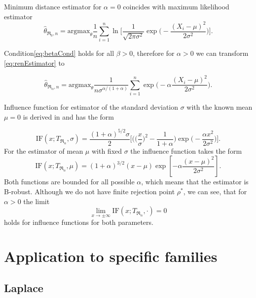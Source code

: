 Minimum \ren distance estimator for $\alpha = 0$ coincides with maximum likelihood estimator
\begin{equation}
\hat{\theta}_{\mathfrak{R}_0,n} = \text{argmax}_{\theta} \frac{1}{n}\sum_{i=1}^n \ln \biggl[\frac{1}{\sqrt{2\pi \sigma^2}} \exp\biggl(-\frac{(X_i-\mu)^2}{2\sigma^2}\biggr)\biggr].
\end{equation}

Condition\eqref{eq:betaCond} holds for all $\beta > 0$, therefore for $\alpha>0$ we can transform {\mRao} \eqref{eq:renEstimator} to

\begin{equation}
	\hat{\theta}_{\mathfrak{R}_\alpha,n} = \text{argmax}_{\theta} \frac{1}{n\sigma^{\alpha/(1+\alpha)}}\sum_{i=1}^n\exp \biggl(-\alpha\frac{(X_i-\mu)^2}{2\sigma^2}\biggr).
\end{equation}

\noindent Influence function for estimator of the standard deviation $\sigma$ with the known mean $\mu = 0$ is derived in \cite{Vajda2009} and has the form

\begin{equation}
	\text{IF}(x;T_{\mathfrak{R}_{\alpha}},\sigma) = \frac{(1+\alpha)^{5/2}\sigma}{2}\biggl[\biggl(\biggl(\frac{x}{\sigma}\biggr)^2-\frac{1}{1+\alpha}\biggr) \exp\biggl(-\frac{\alpha x^2}{2\sigma^2}\biggr)\biggr].
\end{equation}
For the estimator of mean $\mu$ with fixed $\sigma$ the influence function takes the form
\begin{equation}
	\text{IF}(x;T_{\mathfrak{R}_{\alpha}},\mu) = (1+\alpha )^{3/2} (x-\mu ) \exp\left[{-\alpha\frac{(x-\mu )^2}{2 \sigma ^2}}\right].
\end{equation}
Both functions are bounded for all possible $\alpha$, which means that the estimator is B-robust. Although we do not have finite rejection point $\rho^*$, we can see, that for $\alpha>0$ the limit 
\begin{equation}
	\lim_{x \rightarrow \pm\infty} \mathrm{IF}(x;T_{\mathfrak{R}_\alpha},\cdot) = 0
\end{equation}	
holds for influence functions for both parameters.	
	
	\section{Application to specific families}
		

		\subsection{Laplace}
		
